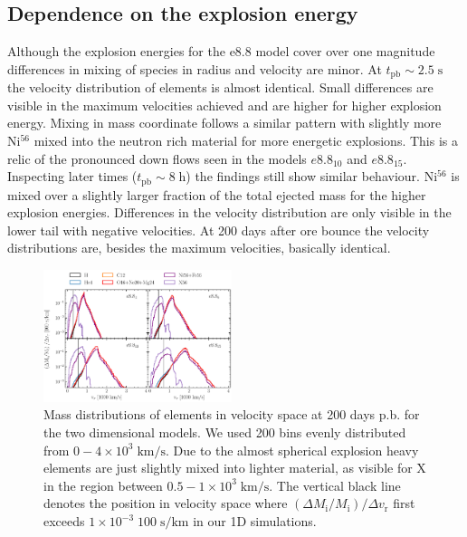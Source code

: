 \documentclass[fleqn,usenatbib]{mnras}
\newcommand{\nickel}{$\mathrm{Ni^{56}}$\xspace}
\newcommand{\tracer}{$\mathrm{X}$\xspace}
\begin{document}
\subsection{Dependence on the explosion energy}
\label{subsec:Dependence on the explosion energy}
Although the explosion energies for the e8.8 model cover over one magnitude differences in mixing of species in radius and velocity are minor. At $t_{\mathrm{pb}}\sim 2.5 \;\mathrm{s}$ the velocity distribution of elements is almost identical. Small differences are visible in the maximum velocities achieved and are higher for higher explosion energy. Mixing in mass coordinate follows a similar pattern with slightly more \nickel mixed into the neutron rich material for more energetic explosions. This is a relic of the pronounced down flows seen in the models $e8.8_{10}$ and $e8.8_{15}$. 
Inspecting later times ($t_{\mathrm{pb}}\sim 8 \;\mathrm{h}$) the findings still show similar behaviour. \nickel is mixed over a slightly larger fraction of the total ejected mass for the higher explosion energies. Differences in the velocity distribution are only visible in the lower tail with negative velocities. 
At 200 days after ore bounce the velocity distributions are, besides the maximum velocities, basically identical.
\begin{figure}
 \label{fig:e8_massDis_32d}
 \centering
 \includegraphics[width=0.49\textwidth]{pic/massDis_mvr_all_time_200d.pdf}
 \caption{Mass distributions of elements in velocity space at 200 days p.b. for the two dimensional models. We used 200 bins evenly distributed from  $0-4\times 10^3\;\mathrm{km/s}$. Due to the almost spherical explosion heavy elements are just slightly mixed into lighter material, as visible for \tracer in the region between $0.5-1\times 10^3\;\mathrm{km/s}$. The vertical black line denotes the position in velocity space where $(\Delta M_{\mathrm{i}}/M_{\mathrm{i}})/\Delta v_{\mathrm{r}}$ first exceeds $1\times 10^{-3}\;\mathrm{100\;s/km}$ in our 1D simulations.}
\end{figure}
\end{document}
